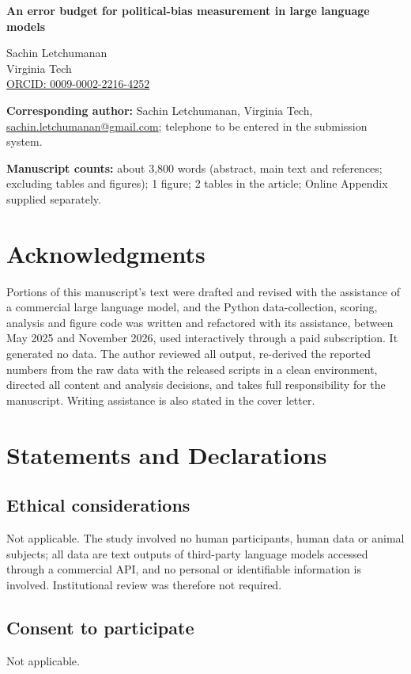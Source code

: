 \documentclass[12pt]{article}
\begin{document}
\begin{center}
{\LARGE\textbf{An error budget for political-bias measurement in large language models}}

\vspace{1em}
{\large Sachin Letchumanan}\\[2pt]
Virginia Tech\\[2pt]
\href{https://orcid.org/0009-0002-2216-4252}{ORCID: 0009-0002-2216-4252}
\end{center}

\textbf{Corresponding author:} Sachin Letchumanan, Virginia Tech, \href{mailto:sachin.letchumanan@gmail.com}{sachin.letchumanan@gmail.com}; telephone to be entered in the submission system.

\textbf{Manuscript counts:} about 3,800 words (abstract, main text and references; excluding tables and figures);
1 figure; 2 tables in the article; Online Appendix supplied separately.

\section*{Acknowledgments}
Portions of this manuscript's text were drafted and revised with the assistance of a commercial large language model,
and the Python data-collection, scoring, analysis and figure code was written and refactored with its assistance,
between May 2025 and November 2026, used interactively through a paid subscription. It generated no data. The author
reviewed all output, re-derived the reported numbers from the raw data with the released scripts in a clean
environment, directed all content and analysis decisions, and takes full responsibility for the manuscript. Writing
assistance is also stated in the cover letter.

\section*{Statements and Declarations}
\subsection*{Ethical considerations}
Not applicable. The study involved no human participants, human data or animal subjects; all data are text outputs of
third-party language models accessed through a commercial API, and no personal or identifiable information is involved.
Institutional review was therefore not required.
\subsection*{Consent to participate}
Not applicable.
\end{document}
